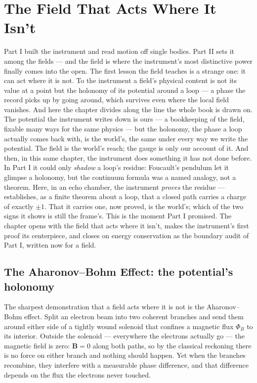 \chapter{The Field That Acts Where It Isn't}
\label{chap:field-that-acts-where-it-isnt}

Part I built the instrument and read motion off single bodies. Part II sets it among the fields --- and the
field is where the instrument's most distinctive power finally comes into the open. The first lesson the field
teaches is a strange one: it can act where it is not. To the instrument a field's physical content is not its
value at a point but the holonomy of its potential around a loop --- a phase the record picks up by going
around, which survives even where the local field vanishes. And here the chapter divides along the line the
whole book is drawn on. The potential the instrument writes down is ours --- a bookkeeping of the field,
fixable many ways for the same physics --- but the holonomy, the phase a loop actually comes back with, is the
world's, the same under every way we write the potential. The field is the world's reach; the gauge is only
our account of it. And then, in this same chapter, the instrument does something it has not done before. In
Part I it could only \emph{shadow} a loop's residue: Foucault's pendulum let it glimpse a holonomy, but the
continuum formula was a named analogy, not a theorem. Here, in an echo chamber, the instrument \emph{proves}
the residue --- establishes, as a finite theorem about a loop, that a closed path carries a charge of exactly
$\pm 1$. That it carries one, now proved, is the world's; which of the two signs it shows is still the frame's.
This is the moment Part I promised. The chapter opens with the field that acts where it isn't, makes the
instrument's first proof its centerpiece, and closes on energy conservation as the boundary audit of Part I,
written now for a field.

\section{The Aharonov--Bohm Effect: the potential's holonomy}
\label{se:aharonov-bohm}

The sharpest demonstration that a field acts where it is not is the Aharonov--Bohm effect. Split an electron
beam into two coherent branches and send them around either side of a tightly wound solenoid that confines a
magnetic flux $\Phi_B$ to its interior. Outside the solenoid --- everywhere the electrons actually go --- the
magnetic field is zero: $\mathbf{B} = 0$ along both paths, so by the classical reckoning there is no force on
either branch and nothing should happen. Yet when the branches recombine, they interfere with a measurable
phase difference, and that difference depends on the flux the electrons never touched.

